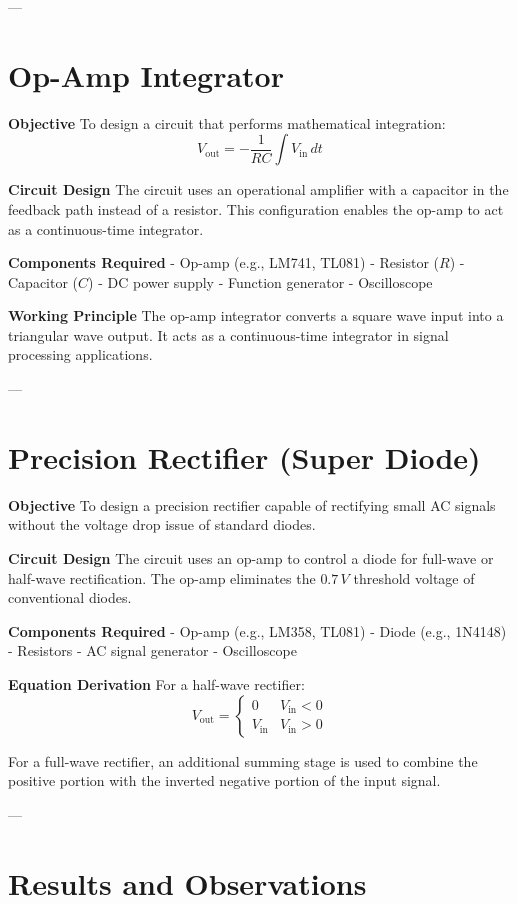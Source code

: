 \documentclass[12pt]{article}
\begin{document}
---

\section{  Op-Amp Integrator}

 \textbf{Objective}
To design a circuit that performs mathematical integration:
\[
V_{\text{out}} = -\frac{1}{RC} \int V_{\text{in}} \, dt
\]

 \textbf{Circuit Design}
The circuit uses an operational amplifier with a capacitor in the feedback path instead of a resistor. This configuration enables the op-amp to act as a continuous-time integrator.

 \textbf{Components Required}
- Op-amp (e.g., LM741, TL081)
- Resistor (\(R\))
- Capacitor (\(C\))
- DC power supply
- Function generator
- Oscilloscope

 \textbf{Working Principle}
The op-amp integrator converts a square wave input into a triangular wave output. It acts as a continuous-time integrator in signal processing applications.

---

\section{  Precision Rectifier (Super Diode)}

 \textbf{Objective}
To design a precision rectifier capable of rectifying small AC signals without the voltage drop issue of standard diodes.

 \textbf{Circuit Design}
The circuit uses an op-amp to control a diode for full-wave or half-wave rectification. The op-amp eliminates the \(0.7\,V\) threshold voltage of conventional diodes.

 \textbf{Components Required}
- Op-amp (e.g., LM358, TL081)
- Diode (e.g., 1N4148)
- Resistors
- AC signal generator
- Oscilloscope

 \textbf{Equation Derivation}
For a half-wave rectifier:
\[
V_{\text{out}} = 
    \begin{cases} 
      0 & V_{\text{in}} < 0 \\ 
      V_{\text{in}} & V_{\text{in}} > 0 
    \end{cases}
\]

For a full-wave rectifier, an additional summing stage is used to combine the positive portion with the inverted negative portion of the input signal.

---

\section{  Results and Observations}
\end{document}
